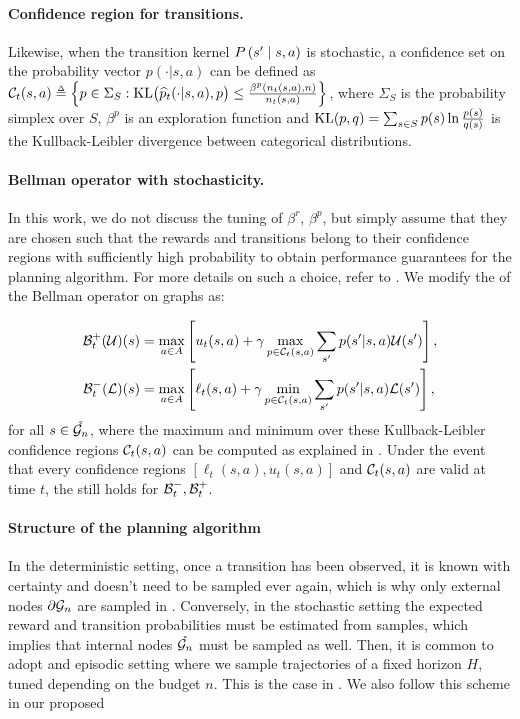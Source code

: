 \paragraph{Confidence region for transitions.}

Likewise, when the transition kernel $P\left(s' \;\middle|\; s,a\right)$ is stochastic, a confidence set on the probability vector $p(\cdot|s,a)$ can be defined as
$\cC_t(s,a) \eqdef \left\{p\in \Sigma_S :  \KL\!\big(\hp_t(\cdot|s,a),p\big) \leq \frac {\beta^p(n_t(s,a), n)} {n_t(s,a)}\right\}$,
where $\Sigma_S$ is the probability simplex over $S$, $\beta^p$ is an exploration function and $\operatorname{KL}(p,q)= \sum_{s \in S}  p(s) \ln \tfrac{ p(s)} {{q}(s)}$ is the Kullback-Leibler divergence between categorical distributions.

\paragraph{Bellman operator with stochasticity.}

In this work, we do not discuss the tuning of $\beta^r$, $\beta^p$, but simply assume that they are chosen such that the rewards and transitions belong to their confidence regions with sufficiently high probability to obtain performance guarantees for the  planning algorithm. For more details on such a choice, refer to \citep[e.g.][]{Leurent2019practical, MDPGapE2020}. We modify the  of the Bellman operator on graphs as:

\begin{align*}
\mathcal{B}_t^+(\mathcal{U})(s) &= \max_{a\in A} \left[u_t(s,a) + \gamma \max_{p \in \mathcal{C}_t(s,a)} \sum_{s'} p(s'|s,a) \mathcal{U}(s')\right], \\
\mathcal{B}_t^-(\mathcal{L})(s) &= \max_{a\in A} \left[\ell_t(s,a) + \gamma \min_{p \in \mathcal{C}_t(s,a)} \sum_{s'} p(s'|s,a)\mathcal{L}(s')\right],
\end{align*}
for all $s\in\mathring{\mathcal{G}_n}$, where the maximum and minimum over these Kullback-Leibler confidence regions $\mathcal{C}_t(s,a)$ can be computed as explained in \citep[Appendix A of][]{Filippi2010optimism}. Under the event that every confidence regions $[\ell_t(s,a), u_t(s,a)]$ and $\mathcal{C}_t(s,a)$ are valid at time $t$, the  still holds for $\mathcal{B}_t^-, \mathcal{B}_t^+$.

\paragraph{Structure of the planning algorithm}

In the deterministic setting, once a transition has been observed, it is known with certainty and doesn't need to be sampled ever again, which is why only external nodes ${\partial \mathcal{G}_n}$ are sampled in \GBOPD. Conversely, in the stochastic setting the expected reward and transition probabilities must be estimated from samples, which implies that internal nodes $\mathring{\mathcal{G}_n}$ must be sampled as well. Then, it is common to adopt and episodic setting where we sample trajectories of a fixed horizon $H$, tuned depending on the budget $n$. This is the case in  \citep[e.g.][]{Kearns02SS,Kocsis06UCT,Bubeck2010open,Feldman14BRUE,Leurent2019practical,MDPGapE2020}. We also follow this scheme in our proposed \GBOP

